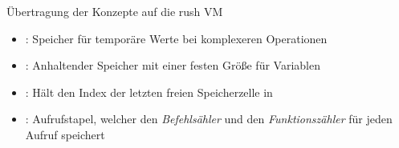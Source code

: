 \begin{frame}{Übertragung der Konzepte auf die rush VM }
	\begin{itemize}
		\item {}: Speicher für temporäre Werte bei komplexeren Operationen
		\item {}: Anhaltender Speicher mit einer festen Größe für Variablen
		\item {}: Hält den Index der letzten freien Speicherzelle in 
		\item {}: Aufrufstapel, welcher den \emph{Befehlsähler} und den \emph{Funktionszähler} für jeden Aufruf speichert
	\end{itemize}
\end{frame}

